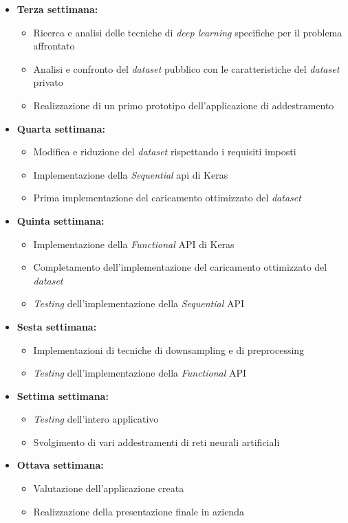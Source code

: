 \begin{itemize}
    \item \textbf{Terza settimana:}
        \begin{itemize}
            \item Ricerca e analisi delle tecniche di \textit{deep learning} specifiche per il problema affrontato
            \item Analisi e confronto del \textit{dataset} pubblico con le caratteristiche del \textit{dataset} privato
            \item Realizzazione di un primo prototipo dell'applicazione di addestramento
        \end{itemize}
    \item \textbf{Quarta settimana:}
        \begin{itemize}
            \item Modifica e riduzione del \textit{dataset} rispettando i requisiti imposti
            \item Implementazione della \textit{Sequential} \gls{api} di Keras
            \item Prima implementazione del caricamento ottimizzato del \textit{dataset}
        \end{itemize}
    \item \textbf{Quinta settimana:}
        \begin{itemize}
            \item Implementazione della \textit{Functional} API di Keras
            \item Completamento dell'implementazione del caricamento ottimizzato del \textit{dataset}
            \item \textit{Testing} dell'implementazione della \textit{Sequential} API
        \end{itemize}
    \item \textbf{Sesta settimana:}
        \begin{itemize}
            \item Implementazioni di tecniche di \gls{downsampling} e di \gls{preprocessing}
            \item \textit{Testing} dell'implementazione della \textit{Functional} API
        \end{itemize}
    \item \textbf{Settima settimana:}
        \begin{itemize}
            \item \textit{Testing} dell'intero applicativo
            \item Svolgimento di vari addestramenti di reti neurali artificiali
        \end{itemize}
    \item \textbf{Ottava settimana:}
        \begin{itemize}
            \item Valutazione dell'applicazione creata
            \item Realizzazione della presentazione finale in azienda
        \end{itemize}
\end{itemize}

